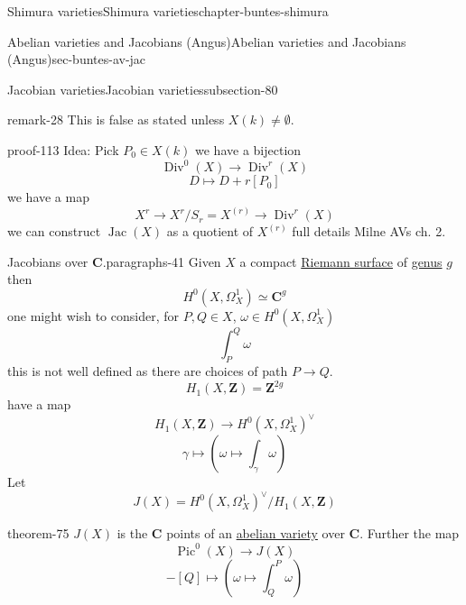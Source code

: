 \documentclass[oneside,10pt,]{book}
\numberwithin{equation}{section}
\newcommand{\ZZ}{\mathbf{Z}}
\newcommand{\CC}{\mathbf{C}}
\DeclareMathOperator{\divisors}{Div}
\DeclareMathOperator{\Pic}{Pic}
\DeclareMathOperator{\Jac}{Jac}
\begin{document}
\begin{chapterptx}{Shimura varieties}{}{Shimura varieties}{}{}{chapter-buntes-shimura}
\begin{sectionptx}{Abelian varieties and Jacobians (Angus)}{}{Abelian varieties and Jacobians (Angus)}{}{}{sec-buntes-av-jac}
\begin{subsectionptx}{Jacobian varieties}{}{Jacobian varieties}{}{}{subsection-80}
\begin{remark}{}{remark-28}
\hypertarget{p-1104}{}%
This is false as stated unless \(X(k) \ne \emptyset\).%
\end{remark}
\begin{proofptx}{}{proof-113}
\hypertarget{p-1105}{}%
Idea: Pick \(P_0 \in X(k)\) we have a bijection%
\begin{equation*}
\divisors^0(X) \to \divisors^r(X)
\end{equation*}
%
\begin{equation*}
D \mapsto D + r[P_0]
\end{equation*}
we have  a map%
\begin{equation*}
X^r \to X^r/ S_r = X^{(r)} \to \divisors^r(X)
\end{equation*}
we can construct \(\Jac(X)\) as a quotient of \(X^{(r)}\) full details Milne AVs ch. 2.%
\end{proofptx}
\begin{paragraphs}{Jacobians over \(\CC\).}{paragraphs-41}%
\hypertarget{p-1106}{}%
Given \(X\) a compact \hyperref[def-top-riem-surface]{Riemann surface} of \hyperref[def-class-set]{genus} \(g\) then%
\begin{equation*}
H^0(X, \Omega_X^1) \simeq \CC^g
\end{equation*}
one might wish to consider, for \(P,Q \in X\), \(\omega\in H^0(X, \Omega_X^1)\)%
\begin{equation*}
\int_P^Q \omega
\end{equation*}
this is not well defined as there are choices of path \(P\to Q\).%
\begin{equation*}
H_1(X,\ZZ) = \ZZ^{2g}
\end{equation*}
have  a map%
\begin{equation*}
H_1(X,\ZZ) \to H^0(X, \Omega_X^1) ^\vee
\end{equation*}
%
\begin{equation*}
\gamma \mapsto (\omega \mapsto \int_\gamma \omega)
\end{equation*}
Let%
\begin{equation*}
J(X) = H^0(X, \Omega_X^1) ^\vee/H_1(X,\ZZ)
\end{equation*}
%
\begin{theorem}{}{}{theorem-75}%
\hypertarget{p-1107}{}%
\(J(X) \) is the \(\CC\) points of an \hyperref[def-buntes-abvar]{abelian variety} over \(\CC\). Further the map%
\begin{equation*}
\Pic^0(X) \to J(X)
\end{equation*}
%
\begin{equation*}
[P] - [Q] \mapsto (\omega \mapsto \int^P_Q \omega)

\end{equation*}
\end{theorem}
\end{paragraphs}
\end{subsectionptx}
\end{sectionptx}
\end{chapterptx}
\end{document}
